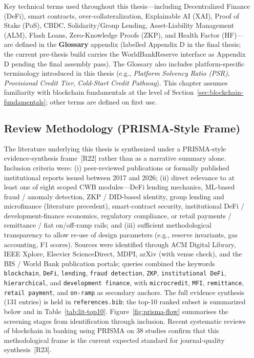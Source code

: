 \documentclass[12pt,a4paper]{report}
\begin{document}
Key technical terms used throughout this thesis---including Decentralized Finance (DeFi), smart contracts, over-collateralization, Explainable AI (XAI), Proof of Stake (PoS), CBDC, Solidarity/Group Lending, Asset-Liability Management (ALM), Flash Loans, Zero-Knowledge Proofs (ZKP), and Health Factor (HF)---are defined in the \textbf{Glossary} appendix (labelled Appendix D in the final thesis; the current pre-thesis build carries the WorldBankReserve interface as Appendix D pending the final assembly pass). The Glossary also includes platform-specific terminology introduced in this thesis (e.g., \textit{Platform Solvency Ratio (PSR)}, \textit{Provisional Credit Tier}, \textit{Cold-Start Credit Pathway}). This chapter assumes familiarity with blockchain fundamentals at the level of Section~\ref{sec:blockchain-fundamentals}; other terms are defined on first use.

\subsection{Review Methodology (PRISMA-Style Frame)}
\label{sec:lit-prisma}

The literature underlying this thesis is synthesized under a PRISMA-style evidence-synthesis frame~[R22] rather than as a narrative summary alone. Inclusion criteria were: (i) peer-reviewed publications or formally published institutional reports issued between 2017 and 2026; (ii) direct relevance to at least one of eight scoped CWB modules---DeFi lending mechanics, ML-based fraud / anomaly detection, ZKP / DID-based identity, group lending and microfinance (literature precedent), smart-contract security, institutional DeFi / development-finance economics, regulatory compliance, or retail payments / remittance / fiat on/off-ramp rails; and (iii) sufficient methodological transparency to allow re-use of design parameters (e.g., reserve invariants, gas accounting, F1 scores). Sources were identified through ACM Digital Library, IEEE Xplore, Elsevier ScienceDirect, MDPI, arXiv (with venue check), and the BIS / World Bank publication portals; queries combined the keywords \texttt{blockchain}, \texttt{DeFi}, \texttt{lending}, \texttt{fraud detection}, \texttt{ZKP}, \texttt{institutional DeFi}, \texttt{hierarchical}, and \texttt{development finance}, with \texttt{microcredit}, \texttt{MFI}, \texttt{remittance}, \texttt{retail payment}, and \texttt{on-ramp} as secondary anchors. The full evidence synthesis (131 entries) is held in \texttt{references.bib}; the top-10 ranked subset is summarized below and in Table~\ref{tab:lit-top10}. Figure~\ref{fig:prisma-flow} summarises the screening stages from identification through inclusion. Recent systematic reviews of blockchain in banking using PRISMA on 38 studies confirm that this methodological frame is the current expected standard for journal-quality synthesis~[R23].
\end{document}
